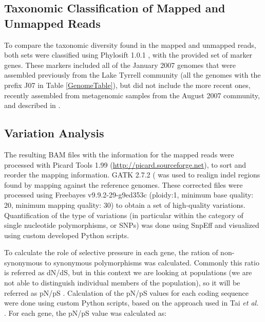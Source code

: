 \subsection{Taxonomic Classification of Mapped and Unmapped Reads}

To compare the taxonomic diversity found in the mapped and unmapped reads, both sets were classified using Phylosift 1.0.1 \cite{Darling:2014ej}, with the provided set of marker genes. These markers included all of the January 2007 genomes that were assembled previously from the Lake Tyrrell community \cite{Narasingarao:2012kp,Podell:2013kx} (all the genomes with the prefix J07 in Table \ref{GenomeTable}), but did not include the more recent ones, recently assembled from metagenomic samples from the August 2007 community, and described in \cite{Podell:2013fp}.

\subsection{Variation Analysis}

The resulting BAM files with the information for the mapped reads were processed with Picard Tools 1.99 (\url{http://picard.sourceforge.net}), to sort and reorder the mapping information. GATK 2.7.2 (\cite{DePristo:2011fo} was used to realign indel regions found by mapping against the reference genomes. These corrected files were processed using Freebayes v9.9.2-29-g9ed353c \cite{Garrison:2012wb} (ploidy:1, minimum base quality: 20, minimum mapping quality: 30) to obtain a set of high-quality variations. Quantification of the type of variations (in particular within the category of single nucleotide polymorphisms, or SNPs) was done using SnpEff \cite{Cingolani:2012cz} and visualized using custom developed Python scripts. 

To calculate the role of selective pressure in each gene, the ration of non-synonymous to synonymous polymorphisms was calculated. Commonly this ratio is referred as dN/dS, but in this context we are looking at populations (we are not able to distinguish individual members of the population), so it will be referred as pN/pS \cite{Schloissnig:2012hx}. Calculation of the pN/pS values for each coding sequence were done using custom Python scripts, based on the approach used in Tai \textit{et al.} \cite{Tai:2011jo}. For each gene, the pN/pS value was calculated as:

\begin{center}
\end{center}

